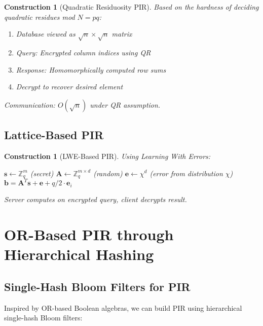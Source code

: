 \documentclass[11pt,final,hidelinks]{article}
\newtheorem{construction}[theorem]{Construction}
\begin{document}
\begin{construction}[Quadratic Residuosity PIR]
Based on the hardness of deciding quadratic residues mod $N = pq$:
\begin{enumerate}
    \item Database viewed as $\sqrt{n} \times \sqrt{n}$ matrix
    \item Query: Encrypted column indices using QR
    \item Response: Homomorphically computed row sums
    \item Decrypt to recover desired element
\end{enumerate}
Communication: $O(\sqrt{n})$ under QR assumption.
\end{construction}

\subsection{Lattice-Based PIR}

\begin{construction}[LWE-Based PIR]
Using Learning With Errors:
\begin{algorithm}[H]
\caption{LWE PIR Query Generation}
$\mathbf{s} \leftarrow \mathbb{Z}_q^m$ (secret)\;
$\mathbf{A} \leftarrow \mathbb{Z}_q^{m \times d}$ (random)\;
$\mathbf{e} \leftarrow \chi^d$ (error from distribution $\chi$)\;
$\mathbf{b} = \mathbf{A}^T \mathbf{s} + \mathbf{e} + q/2 \cdot \mathbf{e}_i$\;
\end{algorithm}
Server computes on encrypted query, client decrypts result.
\end{construction}

\section{OR-Based PIR through Hierarchical Hashing}

\subsection{Single-Hash Bloom Filters for PIR}

Inspired by OR-based Boolean algebras, we can build PIR using hierarchical single-hash Bloom filters:
\end{document}
